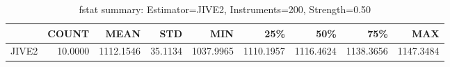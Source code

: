 \begin{table}[ht]
\centering
\caption{fstat summary: Estimator=JIVE2, Instruments=200, Strength=0.50}
\begin{tabular}{lrrrrrrrr}
\toprule
 & COUNT & MEAN & STD & MIN & 25\% & 50\% & 75\% & MAX \\
\midrule
JIVE2 & 10.0000 & 1112.1546 & 35.1134 & 1037.9965 & 1110.1957 & 1116.4624 & 1138.3656 & 1147.3484 \\
\bottomrule
\end{tabular}
\end{table}
